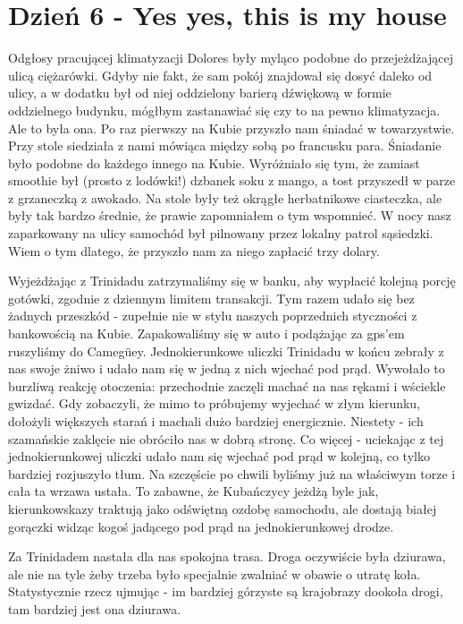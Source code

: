
\chapter[Yes yes, this is my house]{Dzień 6 - Yes yes, this is my house}

Odgłosy pracującej klimatyzacji Dolores były myląco podobne do przejeżdżającej ulicą ciężarówki. 
Gdyby nie fakt, że sam pokój znajdował się dosyć daleko od ulicy, a w dodatku był od niej oddzielony barierą dźwiękową w formie oddzielnego budynku, mógłbym zastanawiać się czy to na pewno klimatyzacja. 
Ale to była ona.
Po raz pierwszy na Kubie przyszło nam śniadać w towarzystwie.
Przy stole siedziała z nami mówiąca między sobą po francusku para.
Śniadanie było podobne do każdego innego na Kubie. 
Wyróżniało się tym, że zamiast smoothie był (prosto z lodówki!) dzbanek soku z mango, a tost przyszedł w parze z grzaneczką z awokado. 
Na stole były też okrągłe herbatnikowe ciasteczka, ale były tak bardzo średnie, że prawie zapomniałem o tym wspomnieć.
W nocy nasz zaparkowany na ulicy samochód był pilnowany przez lokalny patrol sąsiedzki. 
Wiem o tym dlatego, że przyszło nam za niego zapłacić trzy dolary.
\par Wyjeżdżając z Trinidadu zatrzymaliśmy się w banku, aby wypłacić kolejną porcję gotówki, zgodnie z dziennym limitem transakcji. 
Tym razem udało się bez żadnych przeszkód - zupełnie nie w stylu naszych poprzednich styczności z bankowością na Kubie.
Zapakowaliśmy się w auto i podążając za gps’em ruszyliśmy do Camegüey. 
Jednokierunkowe uliczki Trinidadu w końcu zebrały z nas swoje żniwo i udało nam się w jedną z nich wjechać pod prąd.
Wywołało to burzliwą reakcję otoczenia: przechodnie zaczęli machać na nas rękami i wściekle gwizdać. Gdy zobaczyli, że mimo to próbujemy wyjechać w złym kierunku, dołożyli większych starań i machali dużo bardziej energicznie. Niestety - ich szamańskie zaklęcie nie obróciło nas w dobrą stronę.
Co więcej - uciekając z tej jednokierunkowej uliczki udało nam się wjechać pod prąd w kolejną, co tylko bardziej rozjuszyło tłum. 
Na szczęście po chwili byliśmy już na właściwym torze i cała ta wrzawa ustała. 
To zabawne, że Kubańczycy jeżdżą byle jak, kierunkowskazy traktują jako odświętną ozdobę samochodu, ale dostają białej gorączki widząc kogoś jadącego pod prąd na jednokierunkowej drodze. 
\par Za Trinidadem nastała dla nas spokojna trasa.
Droga oczywiście była dziurawa, ale nie na tyle żeby trzeba było specjalnie zwalniać w obawie o utratę koła. 
Statystycznie rzecz ujmując - im bardziej górzyste są krajobrazy dookoła drogi, tam bardziej jest ona dziurawa.
